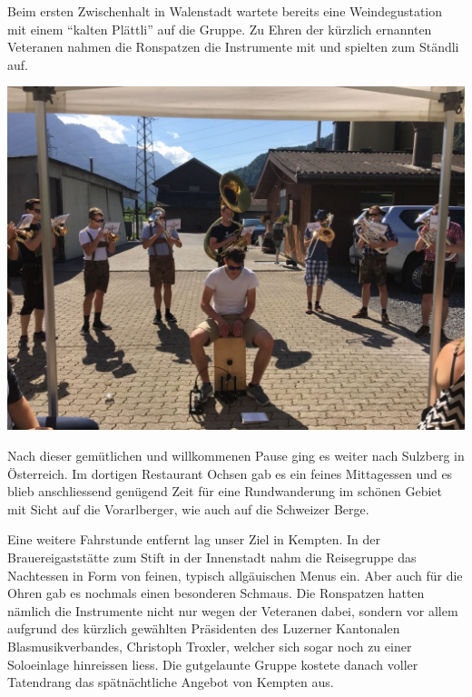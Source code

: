 \begin{history}
    Beim ersten Zwischenhalt in Walenstadt wartete bereits eine Weindegustation
    mit einem \enquote{kalten Plättli} auf die Gruppe. Zu Ehren der kürzlich
    ernannten Veteranen nahmen die Ronspatzen die Instrumente mit und spielten
    zum Ständli auf.

    \begin{MulticolFigure}
        \centering
        \includegraphics[width=0.93\linewidth]{./chap/2001-2024/2017/Ronspatzen.jpg}
    \end{MulticolFigure}

    Nach dieser gemütlichen und willkommenen Pause ging es weiter nach Sulzberg
    in Österreich. Im dortigen Restaurant Ochsen gab es ein feines Mittagessen
    und es blieb anschliessend genügend Zeit für eine Rundwanderung im schönen
    Gebiet mit Sicht auf die Vorarlberger, wie auch auf die Schweizer Berge.

    Eine weitere Fahrstunde entfernt lag unser Ziel in Kempten. In der
    Brauereigaststätte zum Stift in der Innenstadt nahm die Reisegruppe das
    Nachtessen in Form von feinen, typisch allgäuischen Menus ein. Aber auch für
    die Ohren gab es nochmals einen besonderen Schmaus. Die Ronspatzen hatten
    nämlich die Instrumente nicht nur wegen der Veteranen dabei, sondern vor
    allem aufgrund des kürzlich gewählten Präsidenten des Luzerner Kantonalen
    Blasmusikverbandes, Christoph Troxler, welcher sich sogar noch zu einer
    Soloeinlage hinreissen liess. Die gutgelaunte Gruppe kostete danach voller
    Tatendrang das spätnächtliche Angebot von Kempten aus.


\end{history}
